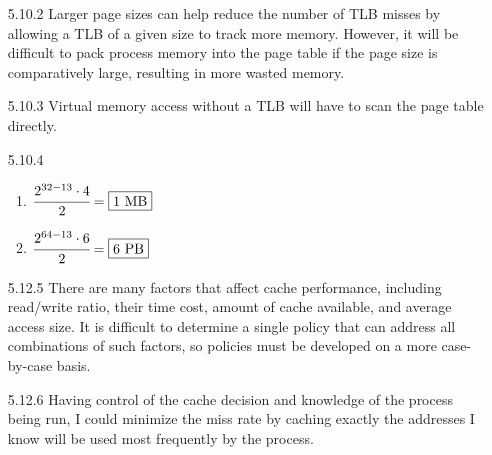 \documentclass[12pt,letterpaper]{article}
\begin{document}
\begin{enumerate}
    \item[5.10.2] Larger page sizes can help reduce the number of TLB misses by
        allowing a TLB of a given size to track more memory. However, it will
        be difficult to pack process memory into the page table if the page
        size is comparatively large, resulting in more wasted memory.
    \item[5.10.3] Virtual memory access without a TLB will have to scan the
        page table directly.
    \item[5.10.4]
        \begin{enumerate}
            \item $\cfrac{2^{32-13} \cdot 4}{2} = \boxed{1\text{ MB}}$
            \item $\cfrac{2^{64-13} \cdot 6}{2} = \boxed{6\text{ PB}}$
        \end{enumerate}
    \item[5.12.5] There are many factors that affect cache performance,
        including read/write ratio, their time cost, amount of cache available,
        and average access size. It is difficult to determine a single policy
        that can address all combinations of such factors, so policies must be
        developed on a more case-by-case basis.
    \item[5.12.6] Having control of the cache decision and knowledge of the
        process being run, I could minimize the miss rate by caching exactly
        the addresses I know will be used most frequently by the process.
\end{enumerate}
\end{document}
